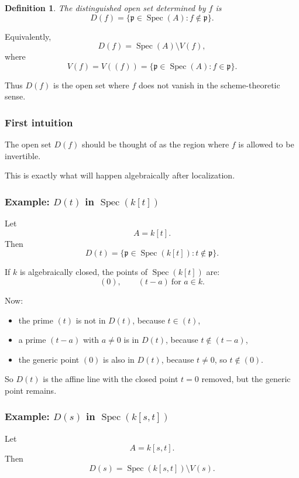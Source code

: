 \documentclass[12pt,a4paper]{article}
\theoremstyle{notespace}
\newtheorem{definition}{Definition}[section]
\newcommand{\Spec}{\operatorname{Spec}}
\newcommand{\mf}{\mathfrak}
\theoremstyle{definition}
\begin{document}
\begin{definition}
	The \emph{distinguished open set} determined by \(f\) is
	\[
	D(f)=\{\mf p\in \Spec(A): f\notin \mf p\}.
	\]
\end{definition}

Equivalently,
\[
D(f)=\Spec(A)\setminus V(f),
\]
where
\[
V(f)=V((f))=\{\mf p\in \Spec(A): f\in \mf p\}.
\]

Thus \(D(f)\) is the open set where \(f\) does not vanish in the scheme-theoretic sense.

\subsubsection{First intuition}

The open set \(D(f)\) should be thought of as the region where \(f\) is allowed to be invertible.

This is exactly what will happen algebraically after localization.

\subsubsection{Example: \(D(t)\) in \(\Spec(k[t])\)}

Let
\[
A=k[t].
\]
Then
\[
D(t)=\{\mf p\in \Spec(k[t]): t\notin \mf p\}.
\]

If \(k\) is algebraically closed, the points of \(\Spec(k[t])\) are:
\[
(0),\qquad (t-a)\ \text{for } a\in k.
\]

Now:

\begin{itemize}
	\item the prime \((t)\) is not in \(D(t)\), because \(t\in (t)\),
	\item a prime \((t-a)\) with \(a\neq 0\) is in \(D(t)\), because \(t\notin (t-a)\),
	\item the generic point \((0)\) is also in \(D(t)\), because \(t\neq 0\), so \(t\notin (0)\).
\end{itemize}

So \(D(t)\) is the affine line with the closed point \(t=0\) removed, but the generic point remains.

\subsubsection{Example: \(D(s)\) in \(\Spec(k[s,t])\)}

Let
\[
A=k[s,t].
\]
Then
\[
D(s)=\Spec(k[s,t])\setminus V(s).
\]
\end{document}
